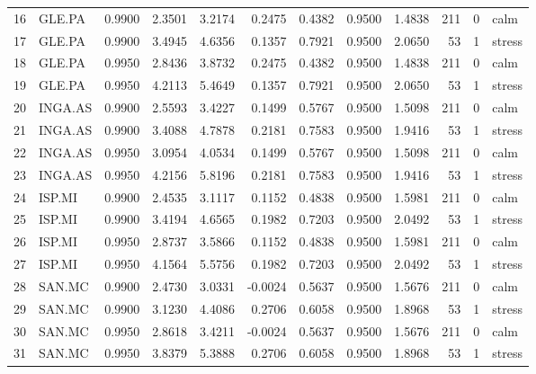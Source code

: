 \begin{table}
\begin{tabular}{llrrrrrrrrrl}
16 & GLE.PA & 0.9900 & 2.3501 & 3.2174 & 0.2475 & 0.4382 & 0.9500 & 1.4838 & 211 & 0 & calm \\
17 & GLE.PA & 0.9900 & 3.4945 & 4.6356 & 0.1357 & 0.7921 & 0.9500 & 2.0650 & 53 & 1 & stress \\
18 & GLE.PA & 0.9950 & 2.8436 & 3.8732 & 0.2475 & 0.4382 & 0.9500 & 1.4838 & 211 & 0 & calm \\
19 & GLE.PA & 0.9950 & 4.2113 & 5.4649 & 0.1357 & 0.7921 & 0.9500 & 2.0650 & 53 & 1 & stress \\
20 & INGA.AS & 0.9900 & 2.5593 & 3.4227 & 0.1499 & 0.5767 & 0.9500 & 1.5098 & 211 & 0 & calm \\
21 & INGA.AS & 0.9900 & 3.4088 & 4.7878 & 0.2181 & 0.7583 & 0.9500 & 1.9416 & 53 & 1 & stress \\
22 & INGA.AS & 0.9950 & 3.0954 & 4.0534 & 0.1499 & 0.5767 & 0.9500 & 1.5098 & 211 & 0 & calm \\
23 & INGA.AS & 0.9950 & 4.2156 & 5.8196 & 0.2181 & 0.7583 & 0.9500 & 1.9416 & 53 & 1 & stress \\
24 & ISP.MI & 0.9900 & 2.4535 & 3.1117 & 0.1152 & 0.4838 & 0.9500 & 1.5981 & 211 & 0 & calm \\
25 & ISP.MI & 0.9900 & 3.4194 & 4.6565 & 0.1982 & 0.7203 & 0.9500 & 2.0492 & 53 & 1 & stress \\
26 & ISP.MI & 0.9950 & 2.8737 & 3.5866 & 0.1152 & 0.4838 & 0.9500 & 1.5981 & 211 & 0 & calm \\
27 & ISP.MI & 0.9950 & 4.1564 & 5.5756 & 0.1982 & 0.7203 & 0.9500 & 2.0492 & 53 & 1 & stress \\
28 & SAN.MC & 0.9900 & 2.4730 & 3.0331 & -0.0024 & 0.5637 & 0.9500 & 1.5676 & 211 & 0 & calm \\
29 & SAN.MC & 0.9900 & 3.1230 & 4.4086 & 0.2706 & 0.6058 & 0.9500 & 1.8968 & 53 & 1 & stress \\
30 & SAN.MC & 0.9950 & 2.8618 & 3.4211 & -0.0024 & 0.5637 & 0.9500 & 1.5676 & 211 & 0 & calm \\
31 & SAN.MC & 0.9950 & 3.8379 & 5.3888 & 0.2706 & 0.6058 & 0.9500 & 1.8968 & 53 & 1 & stress \\
\bottomrule
\end{tabular}
\end{table}
